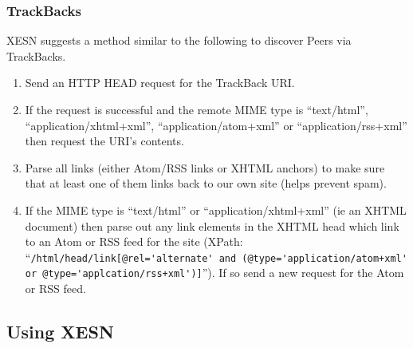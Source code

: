 \documentclass[titlepage,english,a4paper,twoside,dvips]{article}
\begin{document}
\subsubsection{TrackBacks}

XESN suggests a method similar to the following to discover Peers via TrackBacks.

\begin{enumerate}

\item Send an HTTP HEAD request for the TrackBack URI.

\item If the request is successful and the remote MIME type is ``text/html'', ``application/xhtml+xml'', ``application/atom+xml'' or ``application/rss+xml'' then request the URI's contents.

\item Parse all links (either Atom/RSS links or XHTML anchors) to make sure that at least one of them links back to our own site (helps prevent spam).

\item If the MIME type is ``text/html'' or ``application/xhtml+xml'' (ie an XHTML document) then parse out any link elements in the XHTML head which link to an Atom or RSS feed for the site (XPath: ``\verb|/html/head/link[@rel='alternate' and (@type='application/atom+xml' or @type='applcation/rss+xml')]|'').  If so send a new request for the Atom or RSS feed.

\end{enumerate}

\subsection{Using XESN}
\end{document}
